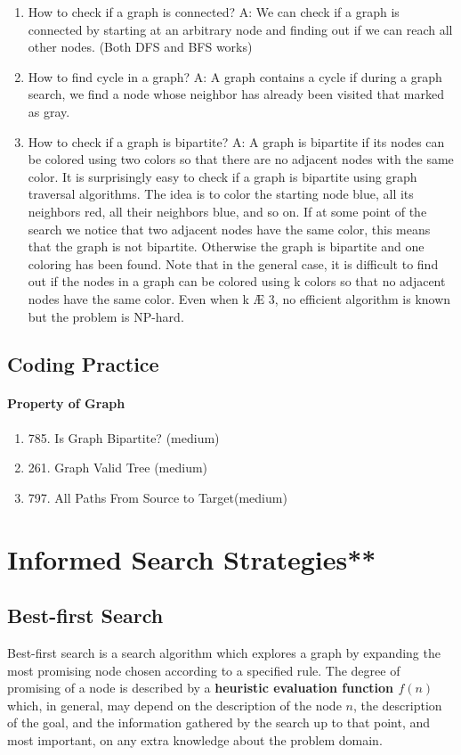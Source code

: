 \documentclass[main.tex]{subfiles}
\begin{document}
\begin{enumerate}
    \item How to check if a graph is connected? A: We can check if a graph is connected by starting at an arbitrary node and finding out if we can reach all other nodes. (Both DFS and BFS works)
    \item How to find cycle in a graph? A: A graph contains a cycle if during a graph search, we find a node whose neighbor has already been visited that marked as gray.
    \item How to check if a graph is bipartite? A: A graph is bipartite if its nodes can be colored using two colors so that there are
no adjacent nodes with the same color. It is surprisingly easy to check if a graph
is bipartite using graph traversal algorithms.
The idea is to color the starting node blue, all its neighbors red, all their
neighbors blue, and so on. If at some point of the search we notice that two
adjacent nodes have the same color, this means that the graph is not bipartite.
Otherwise the graph is bipartite and one coloring has been found. Note that in the general case, it is difficult to find out if the nodes in a graph
can be colored using k colors so that no adjacent nodes have the same color. Even
when k Æ 3, no efficient algorithm is known but the problem is NP-hard.
\end{enumerate}
\subsection{Coding Practice}
\paragraph{Property of Graph}
\begin{enumerate}
    \item 785. Is Graph Bipartite? (medium)
    \item 261. Graph Valid Tree (medium) 
    \item 797. All Paths From Source to Target(medium)
\end{enumerate}

\section{Informed Search Strategies**}
\subsection{Best-first Search}
 Best-first search is a search algorithm which explores a graph by expanding the most promising node  chosen according to a specified rule. The degree of promising of a node is described by a \textbf{heuristic evaluation function $f(n)$} which, in general, may depend on the description of the node $n$, the description of the goal, and the information gathered by the search up to that point, and most important, on any extra knowledge about the problem domain. 
 
\end{document}
